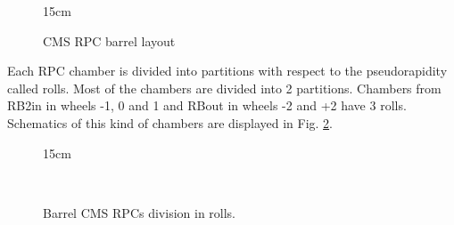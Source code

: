 \begin{figure}[!htm]{15cm} %
\caption{CMS RPC barrel layout}%
\label{fig:RPC_barrel_layout}
\end{figure}

Each RPC chamber is divided into partitions with respect to the pseudorapidity called rolls. Most of the chambers are divided into 2 partitions. Chambers from RB2in in wheels -1, 0 and 1 and RBout in wheels -2 and +2 have 3 rolls. Schematics of this kind of chambers are displayed in Fig. \ref{fig:barrel_chamber_types}.

\begin{figure}[!htm]{15cm}
  \caption{Barrel CMS RPCs division in rolls.} 
  \label{fig:barrel_chamber_types}
  \hfill
  \\
\end{figure}

